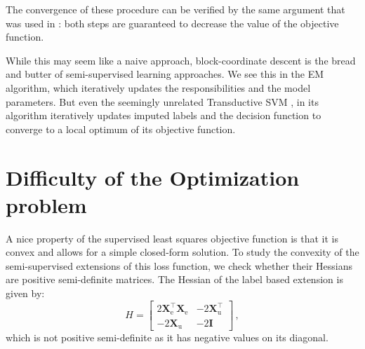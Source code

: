 \documentclass[conference,a4paper,10pt]{IEEEtran}\usepackage[]{graphicx}\usepackage[]{color}
\begin{document}
The convergence of these procedure can be verified by the same argument that was used in \cite{Healy1956}: both steps are guaranteed to decrease the value of the objective function.

While this may seem like a naive approach, block-coordinate descent is the bread and butter of semi-supervised learning approaches. We see this in the EM algorithm, which iteratively updates the responsibilities and the model parameters. But even the seemingly unrelated Transductive SVM \cite{Joachims1999}, in its algorithm iteratively updates imputed labels and the decision function to converge to a local optimum of its objective function.

\section{Difficulty of the Optimization problem}
A nice property of the supervised least squares objective function is that it is convex and allows for a simple closed-form solution. To study the convexity of the semi-supervised extensions of this loss function, we check whether their Hessians are positive semi-definite matrices. The Hessian of the label based extension is given by:
$$
H=\begin{bmatrix} 
2 \mathbf{X}_\text{e}^\top \mathbf{X}_\text{e} & 
-2 \mathbf{X}_\text{u}^\top \\
-2 \mathbf{X}_\text{u} &
-2 \mathbf{I}
\end{bmatrix} \,,
$$
which is not positive semi-definite as it has negative values on its diagonal.
\end{document}
